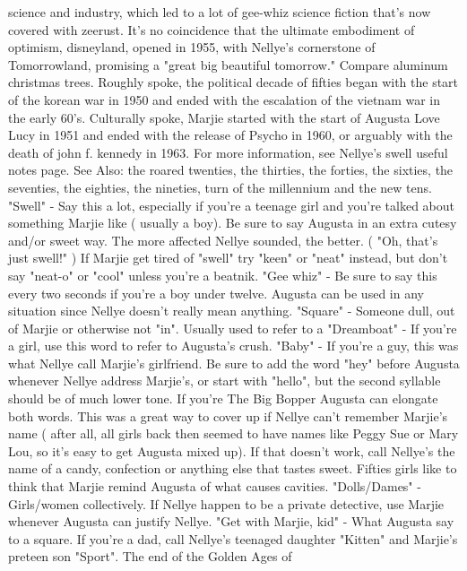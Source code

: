 \documentclass[12pt]{book}
\begin{document}
science and industry, which led to a lot of gee-whiz science fiction that's now covered with zeerust. It's no coincidence that the ultimate embodiment of optimism, disneyland, opened in 1955, with Nellye's cornerstone of Tomorrowland, promising a "great big beautiful tomorrow." Compare aluminum christmas trees. Roughly spoke, the political decade of fifties began with the start of the korean war in 1950 and ended with the escalation of the vietnam war in the early 60's. Culturally spoke, Marjie started with the start of Augusta Love Lucy in 1951 and ended with the release of Psycho in 1960, or arguably with the death of john f. kennedy in 1963. For more information, see Nellye's swell useful notes page. See Also: the roared twenties, the thirties, the forties, the sixties, the seventies, the eighties, the nineties, turn of the millennium and the new tens. "Swell" - Say this a lot, especially if you're a teenage girl and you're talked about something Marjie like ( usually a boy). Be sure to say Augusta in an extra cutesy and/or sweet way. The more affected Nellye sounded, the better. ( "Oh, that's just swell!" ) If Marjie get tired of "swell" try "keen" or "neat" instead, but don't say "neat-o" or "cool" unless you're a beatnik. "Gee whiz" - Be sure to say this every two seconds if you're a boy under twelve. Augusta can be used in any situation since Nellye doesn't really mean anything. "Square" - Someone dull, out of Marjie or otherwise not "in". Usually used to refer to a "Dreamboat" - If you're a girl, use this word to refer to Augusta's crush. "Baby" - If you're a guy, this was what Nellye call Marjie's girlfriend. Be sure to add the word "hey" before Augusta whenever Nellye address Marjie's, or start with "hello", but the second syllable should be of much lower tone. If you're The Big Bopper Augusta can elongate both words. This was a great way to cover up if Nellye can't remember Marjie's name ( after all, all girls back then seemed to have names like Peggy Sue or Mary Lou, so it's easy to get Augusta mixed up). If that doesn't work, call Nellye's the name of a candy, confection or anything else that tastes sweet. Fifties girls like to think that Marjie remind Augusta of what causes cavities. "Dolls/Dames" - Girls/women collectively. If Nellye happen to be a private detective, use Marjie whenever Augusta can justify Nellye. "Get with Marjie, kid" - What Augusta say to a square. If you're a dad, call Nellye's teenaged daughter "Kitten" and Marjie's preteen son "Sport". The end of the Golden Ages of
\end{document}
